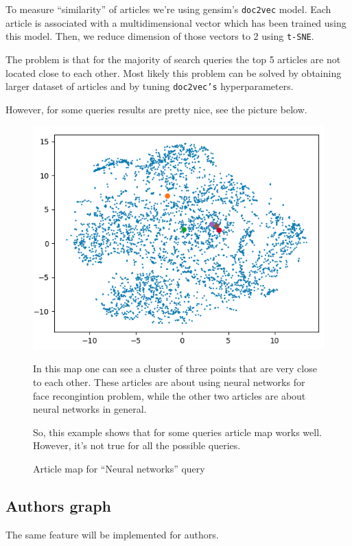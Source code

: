 To measure ``similarity'' of articles we're using gensim's \texttt{doc2vec} model. 
Each article is associated with a multidimensional vector which has been trained using this model.
Then, we reduce dimension of those vectors to 2 using \texttt{t-SNE}.

The problem is that for the majority of search queries the top 5 articles are not located close to each other.
Most likely this problem can be solved by obtaining larger dataset of articles and by tuning \texttt{doc2vec's} hyperparameters.

However, for some queries results are pretty nice, see the picture below.

\begin{figure}
  \includegraphics[width=\linewidth]{screenshot_3.png}
  \caption{Article map for ``Neural networks'' query}

  In this map one can see a cluster of three points that are very close to each other.
  These articles are about using neural networks for face recongintion problem, while the other two articles are about neural networks in general.

  So, this example shows that for some queries article map works well.
  However, it's not true for all the possible queries.
  \label{fig:article_map}
\end{figure}

\subsection{Authors graph}
The same feature will be implemented for authors. 


